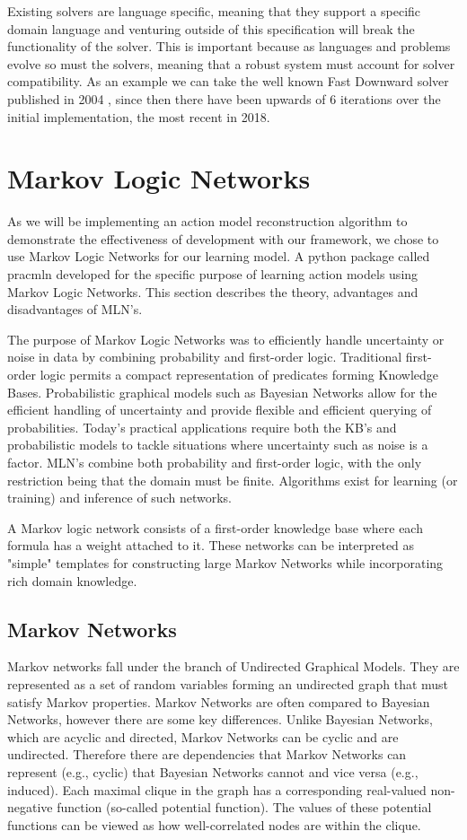 Existing solvers are language specific, meaning that they support a specific domain language and venturing outside of this specification will break the functionality of the solver. This is important because as languages and problems evolve so must the solvers, meaning that a robust system must account for solver compatibility. As an example we can take the well known Fast Downward solver published in 2004 \cite{FastDown46:online}, since then there have been upwards of 6 iterations over the initial implementation, the most recent in 2018. 



\section{Markov Logic Networks}
As we will be implementing an action model reconstruction algorithm to demonstrate the effectiveness of development with our framework, we chose to use Markov Logic Networks for our learning model. A python package called pracmln \cite{pracmln} developed for the specific purpose of learning action models using Markov Logic Networks. This section describes the theory, advantages and disadvantages of MLN's.

The purpose of Markov Logic Networks was to efficiently handle uncertainty or noise in data by combining probability and first-order logic. Traditional first-order logic permits a compact representation of predicates forming Knowledge Bases. Probabilistic graphical models such as Bayesian Networks allow for the efficient handling of uncertainty and provide flexible and efficient querying of probabilities. Today's practical applications require both the KB's and probabilistic models to tackle situations where uncertainty such as noise is a factor. MLN's combine both probability and first-order logic, with the only restriction being that the domain must be finite. Algorithms exist for learning (or training) and inference of such networks. 

A Markov logic network consists of a first-order knowledge base where each formula has a weight attached to it. These networks can be interpreted as "simple" templates for constructing large Markov Networks while incorporating rich domain knowledge.

\subsection{Markov Networks}
Markov networks fall under the branch of Undirected Graphical Models. 
They are represented as a set of random variables forming an undirected graph that must satisfy Markov properties. Markov Networks are often compared to Bayesian Networks, however there are some key differences. Unlike Bayesian Networks, which are acyclic and directed, Markov Networks can be cyclic and are undirected. Therefore there are dependencies that Markov Networks can represent (e.g., cyclic) that Bayesian Networks cannot and vice versa (e.g., induced).
Each maximal clique in the graph has a corresponding real-valued non-negative function (so-called potential function). The values of these potential functions can be viewed as how well-correlated nodes are within the clique.

